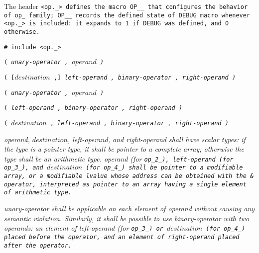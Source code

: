 The header \tt{<op._>} defines the macro \tt{OP__} that configures
the behavior of \tt{op_} family; \tt{OP__} records the \tt{defined}
state of \tt{DEBUG} macro whenever \tt{<op._>} is included:
it expands to \tt{1} if \tt{DEBUG} was defined, and \tt{0} otherwise.


\tt{# include <op._>}

\s\s\s\tt{(} \it{unary-operator} \tt{,} $operand$ \tt{)}

\s\s\s\tt{(} [$destination$ \tt{,}]
\it{left-operand} \tt{,} \it{binary-operator} \tt{,} \it{right-operand} \tt{)}

\s\tt{(} \it{unary-operator} \tt{,} $operand$ \tt{)}

\s\tt{(} \phantom{[}\it{left-operand} \tt{,}\phantom{]}
\it{binary-operator} \tt{,} \it{right-operand} \tt{)}

\s\tt{(} \phantom{[}$destination$  \tt{,}\phantom{]}
\it{left-operand} \tt{,} \it{binary-operator} \tt{,} \it{right-operand} \tt{)}


\it{operand}, $destination$, \it{left-operand}, and \it{right-operand}
shall have scalar types: if the type is a pointer type, it shall be
pointer to a complete array; otherwise the type shall be an arithmetic type.
\it{operand} (for \tt{op_2_}), \it{left-operand} (for \tt{op_3_}),
and $destination$ (for \tt{op_4_}) shall be pointer to a modifiable array,
or a modifiable lvalue whose address can be obtained with the \tt{&} operator,
interpreted as pointer to an array having a single element of arithmetic type.

\it{unary-operator} shall be applicable on each element
of \it{operand} without causing any semantic violation.
Similarly, it shall be possible to use \it{binary-operator} with
two operands: an element of \it{left-operand} (for \tt{op_3_})
or $destination$ (for \tt{op_4_}) placed before the operator,
and an element of \it{right-operand} placed after the operator.


